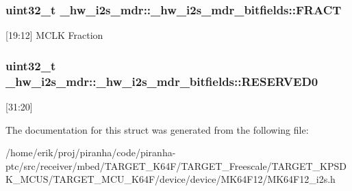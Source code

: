 \subsubsection[{\texorpdfstring{F\+R\+A\+CT}{FRACT}}]{\setlength{\rightskip}{0pt plus 5cm}uint32\+\_\+t \+\_\+hw\+\_\+i2s\+\_\+mdr\+::\+\_\+hw\+\_\+i2s\+\_\+mdr\+\_\+bitfields\+::\+F\+R\+A\+CT}\hypertarget{struct__hw__i2s__mdr_1_1__hw__i2s__mdr__bitfields_a7686f44fa14863852b7ae7d727b5874a}{}\label{struct__hw__i2s__mdr_1_1__hw__i2s__mdr__bitfields_a7686f44fa14863852b7ae7d727b5874a}
\mbox{[}19\+:12\mbox{]} M\+C\+LK Fraction 
\subsubsection[{\texorpdfstring{R\+E\+S\+E\+R\+V\+E\+D0}{RESERVED0}}]{\setlength{\rightskip}{0pt plus 5cm}uint32\+\_\+t \+\_\+hw\+\_\+i2s\+\_\+mdr\+::\+\_\+hw\+\_\+i2s\+\_\+mdr\+\_\+bitfields\+::\+R\+E\+S\+E\+R\+V\+E\+D0}\hypertarget{struct__hw__i2s__mdr_1_1__hw__i2s__mdr__bitfields_ad26e91020b07f9360af2c0f2b23d89d3}{}\label{struct__hw__i2s__mdr_1_1__hw__i2s__mdr__bitfields_ad26e91020b07f9360af2c0f2b23d89d3}
\mbox{[}31\+:20\mbox{]} 

The documentation for this struct was generated from the following file\+:\begin{DoxyCompactItemize}
\item 
/home/erik/proj/piranha/code/piranha-\/ptc/src/receiver/mbed/\+T\+A\+R\+G\+E\+T\+\_\+\+K64\+F/\+T\+A\+R\+G\+E\+T\+\_\+\+Freescale/\+T\+A\+R\+G\+E\+T\+\_\+\+K\+P\+S\+D\+K\+\_\+\+M\+C\+U\+S/\+T\+A\+R\+G\+E\+T\+\_\+\+M\+C\+U\+\_\+\+K64\+F/device/device/\+M\+K64\+F12/M\+K64\+F12\+\_\+i2s.\+h\end{DoxyCompactItemize}
